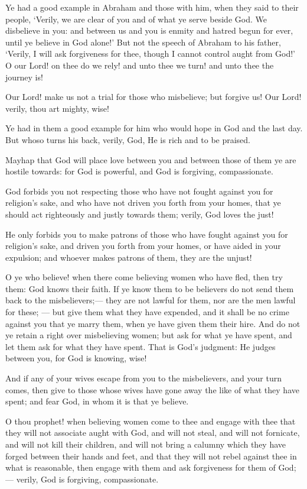 \documentclass[fontsize=14pt, letterpaper, notitlepage, openany, DIV=12]{scrbook} %
\begin{document}
\noindent[60:4]
Ye had a good example in Abraham and those with him, when they said to their people,
`Verily, we are clear of you and of what ye serve beside God. We disbelieve in you: and between
us and you is enmity and hatred begun for ever, until ye believe in God alone!' But not the
speech of Abraham to his father, `Verily, I will ask forgiveness for thee, though I cannot control
aught from God!' O our Lord! on thee do we rely! and unto thee we turn! and unto thee the
journey is!

\noindent[60:5]
Our Lord! make us not a trial for those who misbelieve; but forgive us! Our Lord! verily,
thou art mighty, wise!

\noindent[60:6]
Ye had in them a good example for him who would hope in God and the last day. But
whoso turns his back, verily, God, He is rich and to be praised.

\noindent[60:7]
Mayhap that God will place love between you and between those of them ye are hostile
towards: for God is powerful, and God is forgiving, compassionate.

\noindent[60:8]
God forbids you not respecting those who have not fought against you for religion's sake,
and who have not driven you forth from your homes, that ye should act righteously and justly
towards them; verily, God loves the just!

\noindent[60:9]
He only forbids you to make patrons of those who have fought against you for religion's
sake, and driven you forth from your homes, or have aided in your expulsion; and whoever
makes patrons of them, they are the unjust!

\noindent[60:10]
O ye who believe! when there come believing women who have fled, then try them: God
knows their faith. If ye know them to be believers do not send them back to the misbelievers;---
they are not lawful for them, nor are the men lawful for these; --- but give them what they have
expended, and it shall be no crime against you that ye marry them, when ye have given them
their hire. And do not ye retain a right over misbelieving women; but ask for what ye have spent,
and let them ask for what they have spent. That is God's judgment: He judges between you, for
God is knowing, wise!

\noindent[60:11]
And if any of your wives escape from you to the misbelievers, and your turn comes, then
give to those whose wives have gone away the like of what they have spent; and fear God, in
whom it is that ye believe.

\noindent[60:12]
O thou prophet! when believing women come to thee and engage with thee that they will
not associate aught with God, and will not steal, and will not fornicate, and will not kill their
children, and will not bring a calumny which they have forged between their hands and feet, and
that they will not rebel against thee in what is reasonable, then engage with them and ask
forgiveness for them of God;--- verily, God is forgiving, compassionate.
\end{document}
